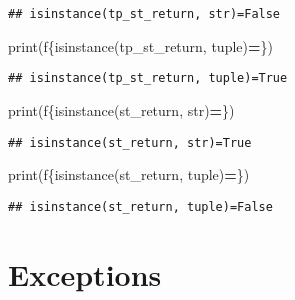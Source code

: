 \documentclass[
]{book}
\newenvironment{Shaded}{\begin{snugshade}}{\end{snugshade}}
\newcommand{\BuiltInTok}[1]{#1}
\newcommand{\NormalTok}[1]{#1}
\newcommand{\OperatorTok}[1]{\textcolor[rgb]{0.81,0.36,0.00}{\textbf{#1}}}
\newcommand{\SpecialCharTok}[1]{\textcolor[rgb]{0.00,0.00,0.00}{#1}}
\newcommand{\SpecialStringTok}[1]{\textcolor[rgb]{0.31,0.60,0.02}{#1}}
\begin{document}
\begin{verbatim}
## isinstance(tp_st_return, str)=False
\end{verbatim}

\begin{Shaded}
\begin{Highlighting}[]
\BuiltInTok{print}\NormalTok{(}\SpecialStringTok{f\textquotesingle{}}\SpecialCharTok{\{}\BuiltInTok{isinstance}\NormalTok{(tp\_st\_return, }\BuiltInTok{tuple}\NormalTok{)}\OperatorTok{=}\SpecialCharTok{\}}\SpecialStringTok{\textquotesingle{}}\NormalTok{)}
\end{Highlighting}
\end{Shaded}

\begin{verbatim}
## isinstance(tp_st_return, tuple)=True
\end{verbatim}

\begin{Shaded}
\begin{Highlighting}[]
\BuiltInTok{print}\NormalTok{(}\SpecialStringTok{f\textquotesingle{}}\SpecialCharTok{\{}\BuiltInTok{isinstance}\NormalTok{(st\_return, }\BuiltInTok{str}\NormalTok{)}\OperatorTok{=}\SpecialCharTok{\}}\SpecialStringTok{\textquotesingle{}}\NormalTok{)}
\end{Highlighting}
\end{Shaded}

\begin{verbatim}
## isinstance(st_return, str)=True
\end{verbatim}

\begin{Shaded}
\begin{Highlighting}[]
\BuiltInTok{print}\NormalTok{(}\SpecialStringTok{f\textquotesingle{}}\SpecialCharTok{\{}\BuiltInTok{isinstance}\NormalTok{(st\_return, }\BuiltInTok{tuple}\NormalTok{)}\OperatorTok{=}\SpecialCharTok{\}}\SpecialStringTok{\textquotesingle{}}\NormalTok{)}
\end{Highlighting}
\end{Shaded}

\begin{verbatim}
## isinstance(st_return, tuple)=False
\end{verbatim}

\hypertarget{exceptions}{%
\section{Exceptions}\label{exceptions}}
\end{document}
